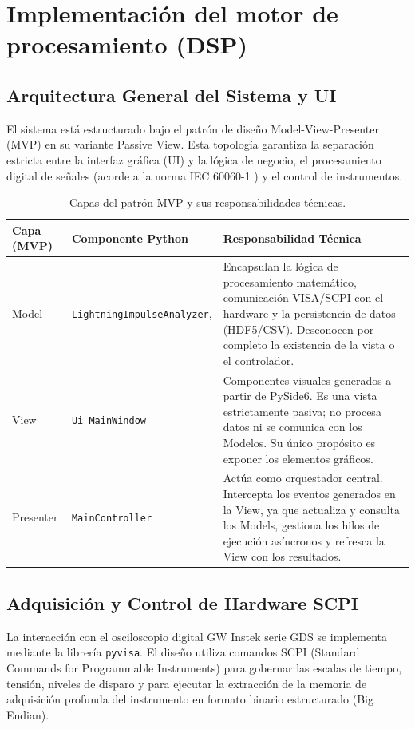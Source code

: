 \newpage
\chapter{Implementación del motor de procesamiento (DSP)}
\vspace{3\baselineskip}

\section{Arquitectura General del Sistema y UI}
El sistema está estructurado bajo el patrón de diseño Model-View-Presenter (MVP) en su variante Passive View. Esta topología garantiza la separación estricta entre la interfaz gráfica (UI) y la lógica de negocio, el procesamiento digital de señales (acorde a la norma IEC 60060-1 \cite{iec60060_1}) y el control de instrumentos.

\begin{table}[h]
    \centering
    \caption{Capas del patrón MVP y sus responsabilidades técnicas.}
    \label{tab:arquitectura_mvp}
    \begin{tabular}{@{}llp{8.5cm}@{}}
        \toprule
        \textbf{Capa (MVP)} & \textbf{Componente Python} & \textbf{Responsabilidad Técnica} \\ \midrule
        Model & \texttt{LightningImpulseAnalyzer}, & Encapsulan la lógica de procesamiento matemático, comunicación VISA/SCPI con el hardware y la persistencia de datos (HDF5/CSV). Desconocen por completo la existencia de la vista o el controlador. \\ \midrule
        View & \texttt{Ui\_MainWindow} & Componentes visuales generados a partir de PySide6. Es una vista estrictamente pasiva; no procesa datos ni se comunica con los Modelos. Su único propósito es exponer los elementos gráficos. \\ \midrule
        Presenter & \texttt{MainController} & Actúa como orquestador central. Intercepta los eventos generados en la View, ya que actualiza y consulta los Models, gestiona los hilos de ejecución asíncronos y refresca la View con los resultados. \\ \bottomrule
    \end{tabular}
\end{table}

\section{Adquisición y Control de Hardware SCPI}
La interacción con el osciloscopio digital GW Instek serie GDS se implementa mediante la librería \texttt{pyvisa}. El diseño utiliza comandos SCPI (Standard Commands for Programmable Instruments) para gobernar las escalas de tiempo, tensión, niveles de disparo y para ejecutar la extracción de la memoria de adquisición profunda del instrumento en formato binario estructurado (Big Endian).

